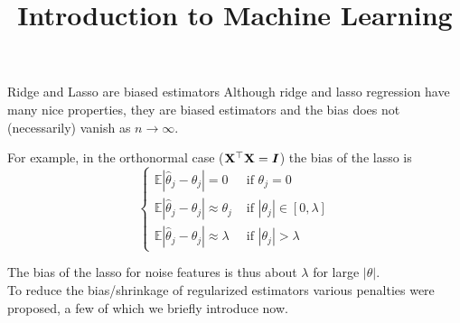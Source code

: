 \documentclass[11pt,compress,t,notes=noshow, xcolor=table]{beamer}
\title{Introduction to Machine Learning}
\date{}
\begin{document}

\begin{vbframe}{Ridge and Lasso are biased estimators} 
Although ridge and lasso regression have many nice properties, they are biased estimators and the bias does not (necessarily) vanish as $n \rightarrow \infty$.\\
\vspace{0.3cm}

For example, in the orthonormal case ($\mathbf{X}^{\top}\mathbf{X}=\bm{I}$) the bias of the lasso is
$$
\begin{cases}\mathbb{E}\left|\widehat{\theta}_j-\theta_j\right|=0 & \text { if } \theta_j=0 \\ \mathbb{E}\left|\widehat{\theta}_j-\theta_j\right| \approx \theta_j & \text { if }\left|\theta_j\right| \in[0, \lambda] \\ \mathbb{E}\left|\widehat{\theta}_j-\theta_j\right| \approx \lambda & \text { if }\left|\theta_j\right|>\lambda\end{cases}
$$
\vspace{0.3cm}

The bias of the lasso for noise features is thus about $\lambda$ for large $|\theta|$.\\
\vspace{0.2cm}
To reduce the bias/shrinkage of regularized estimators various penalties were proposed, a few of which we briefly introduce now.

\end{vbframe}
\end{document}
